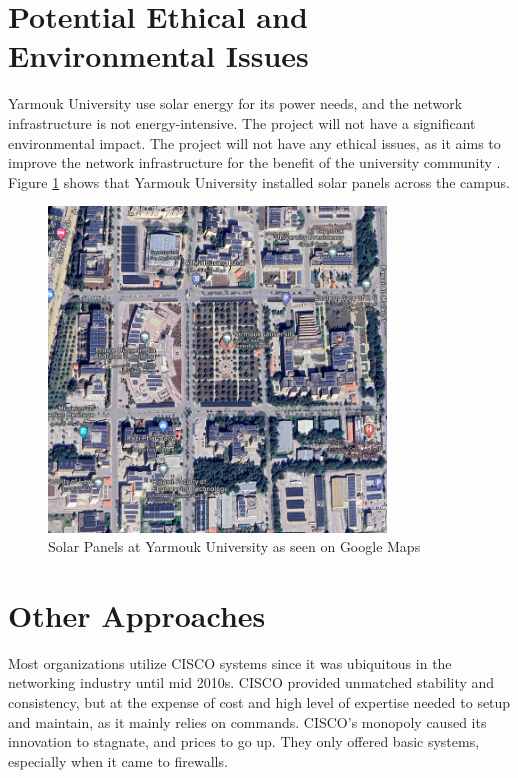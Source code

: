 \documentclass[12pt]{report}
\begin{document}
\section{Potential Ethical and Environmental Issues}
Yarmouk University use solar energy for its power needs, and the network infrastructure is not energy-intensive. The project will not have a significant environmental impact. The project will not have any ethical issues, as it aims to improve the network infrastructure for the benefit of the university community \cite{Solar}. Figure \ref{fig:YUMap} shows that Yarmouk University installed solar panels across the campus. 
\begin{figure}[h]
    \centering
    \includegraphics[width=0.8\textwidth]{images/Maps.png}
    \caption{Solar Panels at Yarmouk University as seen on Google Maps}
    \label{fig:YUMap}
\end{figure}
\newpage
\section{Other Approaches}
Most organizations utilize CISCO systems since it was ubiquitous in the networking industry until mid 2010s. CISCO provided unmatched stability and consistency, but at the expense of cost and high level of expertise needed to setup and maintain, as it mainly relies on commands. CISCO's monopoly caused its innovation to stagnate, and prices to go up. They only offered basic systems, especially when it came to firewalls.\cite{FNvsCISCO} \cite{CISCOInntoFin}

\end{document}
